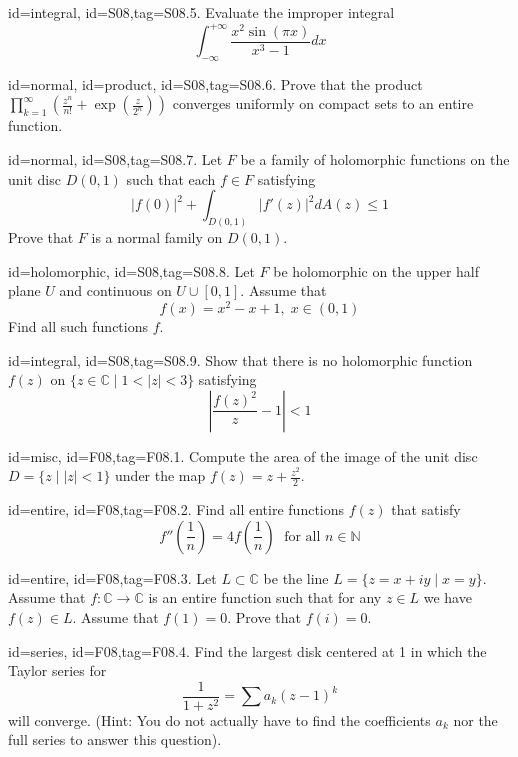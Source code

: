\documentclass[12pt,letterpaper]{article}
\theoremstyle{plain}
\theoremstyle{definition}
\begin{document}
{\item[id=integral, id=S08,tag=S08.5.]
Evaluate the improper integral
\[
	\int_{-\infty}^{+\infty} \frac{x^2 \sin(\pi x)}{x^3 - 1} dx
\]

\item[id=normal, id=product, id=S08,tag=S08.6.]
Prove that the product $\prod_{k=1}^{\infty}\left(\frac{z^n}{n!} + \exp(\frac{z}{2^n}) \right)$ converges uniformly on compact sets to an entire function.

\item[id=normal, id=S08,tag=S08.7.]
Let $F$ be a family of holomorphic functions on the unit disc $D(0,1)$ such that each $f \in F$ satisfying
\[
	| f(0) |^2 + \int_{D(0,1)} | f'(z) |^2 dA(z) \le 1
\]
Prove that $F$ is a normal family on $D(0,1)$.

\item[id=holomorphic, id=S08,tag=S08.8.]
Let $F$ be holomorphic on the upper half plane $U$ and continuous on $U \cup [0,1]$. Assume that
\[
	f(x) = x^2 - x + 1, \; x \in (0,1)
\]
Find all such functions $f$.

\item[id=integral, id=S08,tag=S08.9.]
Show that there is no holomorphic function $f(z)$ on $\{z \in \mathbb{C} \mid 1 < | z | < 3\}$ satisfying
\[
	\left| \frac{f(z)^2}{z} - 1 \right| < 1
\]


\item[id=misc, id=F08,tag=F08.1.]
Compute the area of the image of the unit disc $D = \{z \mid | z | < 1\}$ under the map $f(z) = z + \frac{z^2}{2}$.
\item[id=entire, id=F08,tag=F08.2.]
Find all entire functions $f(z)$ that satisfy
\[
	f''\left(\frac{1}{n}\right) = 4f\left(\frac{1}{n}\right) \; \text{ for all } n \in \mathbb{N}
\]

\item[id=entire, id=F08,tag=F08.3.]
Let $L \subset \mathbb{C}$ be the line $L = \{z = x + iy \mid x = y\}$. Assume that $f : \mathbb{C} \rightarrow \mathbb{C}$ is an entire function such that for any $z \in L$ we have $f(z) \in L$. Assume that $f(1) = 0$. Prove that $f(i) = 0$.

\item[id=series, id=F08,tag=F08.4.]
Find the largest disk centered at 1 in which the Taylor series for
\[
	\frac{1}{1+z^2} = \sum a_k(z-1)^k
\]
will converge. (Hint: You do not actually have to find the coefficients $a_k$ nor the full series to answer this question).

}
\end{document}
